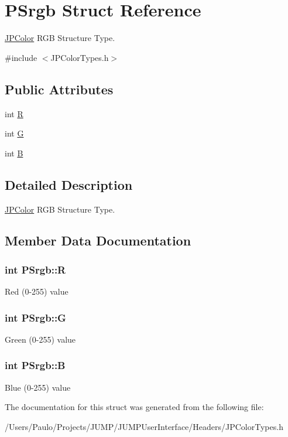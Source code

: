 \hypertarget{struct_p_srgb}{
\section{PSrgb Struct Reference}
\label{struct_p_srgb}
}


\hyperlink{interface_j_p_color}{JPColor} RGB Structure Type.  




{\ttfamily \#include $<$JPColorTypes.h$>$}

\subsection*{Public Attributes}
\begin{DoxyCompactItemize}
\item 
int \hyperlink{struct_p_srgb_a1f7493ccd03172546141e07e87c53718}{R}
\item 
int \hyperlink{struct_p_srgb_ac36841c4e521dd6b3fee2d32e5fb170f}{G}
\item 
int \hyperlink{struct_p_srgb_a2f781303d7eb8a9f90026da80719e342}{B}
\end{DoxyCompactItemize}


\subsection{Detailed Description}
\hyperlink{interface_j_p_color}{JPColor} RGB Structure Type. 

\subsection{Member Data Documentation}
\hypertarget{struct_p_srgb_a1f7493ccd03172546141e07e87c53718}{
\subsubsection[{R}]{\setlength{\rightskip}{0pt plus 5cm}int {\bf PSrgb::R}}}
\label{struct_p_srgb_a1f7493ccd03172546141e07e87c53718}
Red (0-\/255) value \hypertarget{struct_p_srgb_ac36841c4e521dd6b3fee2d32e5fb170f}{
\subsubsection[{G}]{\setlength{\rightskip}{0pt plus 5cm}int {\bf PSrgb::G}}}
\label{struct_p_srgb_ac36841c4e521dd6b3fee2d32e5fb170f}
Green (0-\/255) value \hypertarget{struct_p_srgb_a2f781303d7eb8a9f90026da80719e342}{
\subsubsection[{B}]{\setlength{\rightskip}{0pt plus 5cm}int {\bf PSrgb::B}}}
\label{struct_p_srgb_a2f781303d7eb8a9f90026da80719e342}
Blue (0-\/255) value 

The documentation for this struct was generated from the following file:\begin{DoxyCompactItemize}
\item 
/Users/Paulo/Projects/JUMP/JUMPUserInterface/Headers/JPColorTypes.h\end{DoxyCompactItemize}

